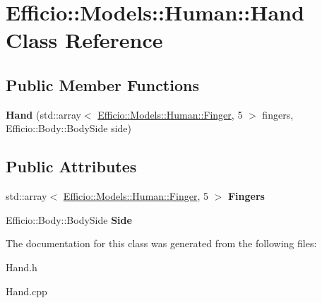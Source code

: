 \hypertarget{class_efficio_1_1_models_1_1_human_1_1_hand}{}\section{Efficio\+:\+:Models\+:\+:Human\+:\+:Hand Class Reference}
\label{class_efficio_1_1_models_1_1_human_1_1_hand}
\subsection*{Public Member Functions}
\begin{DoxyCompactItemize}
\item 
{\bfseries Hand} (std\+::array$<$ \hyperlink{class_efficio_1_1_models_1_1_human_1_1_finger}{Efficio\+::\+Models\+::\+Human\+::\+Finger}, 5 $>$ fingers, Efficio\+::\+Body\+::\+Body\+Side side)\hypertarget{class_efficio_1_1_models_1_1_human_1_1_hand_a53d27d7af57195c07152029bdbbc47d7}{}\label{class_efficio_1_1_models_1_1_human_1_1_hand_a53d27d7af57195c07152029bdbbc47d7}

\end{DoxyCompactItemize}
\subsection*{Public Attributes}
\begin{DoxyCompactItemize}
\item 
std\+::array$<$ \hyperlink{class_efficio_1_1_models_1_1_human_1_1_finger}{Efficio\+::\+Models\+::\+Human\+::\+Finger}, 5 $>$ {\bfseries Fingers}\hypertarget{class_efficio_1_1_models_1_1_human_1_1_hand_aa891b997e3148afe3f251fbbb1027145}{}\label{class_efficio_1_1_models_1_1_human_1_1_hand_aa891b997e3148afe3f251fbbb1027145}

\item 
Efficio\+::\+Body\+::\+Body\+Side {\bfseries Side}\hypertarget{class_efficio_1_1_models_1_1_human_1_1_hand_a9ead927dffc76db7a048cde9d3978c4d}{}\label{class_efficio_1_1_models_1_1_human_1_1_hand_a9ead927dffc76db7a048cde9d3978c4d}

\end{DoxyCompactItemize}


The documentation for this class was generated from the following files\+:\begin{DoxyCompactItemize}
\item 
Hand.\+h\item 
Hand.\+cpp\end{DoxyCompactItemize}

